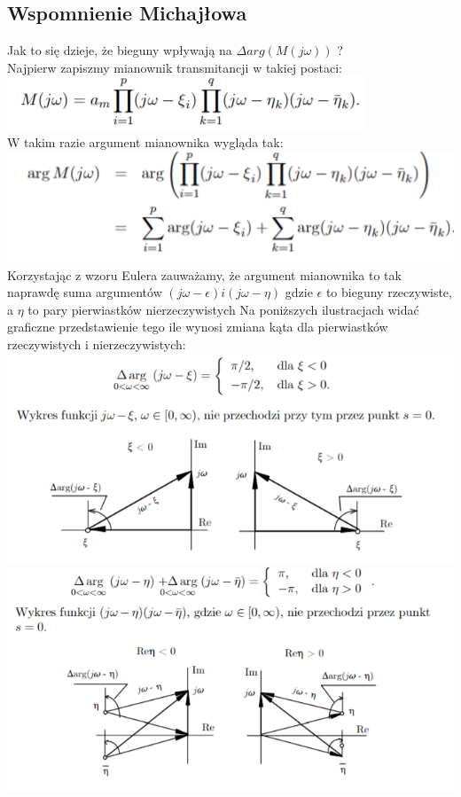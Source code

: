 \documentclass{article}
\begin{document}
\subsection{Wspomnienie Michajłowa}
\begin{center}
Jak to się dzieje, że bieguny wpływają na $\Delta arg(M(j\omega))$ ?\\Najpierw zapiszmy mianownik transmitancji w takiej postaci:
\includegraphics[]{mich1.png}\\
W takim razie argument mianownika wygląda tak:
\includegraphics[]{mich2.png}
Korzystając z wzoru Eulera zauważamy, że argument mianownika to tak naprawdę suma argumentów $(j\omega -\epsilon) i (j\omega -\eta)$ gdzie $\epsilon$ to bieguny rzeczywiste, a $\eta$ to pary pierwiastków nierzeczywistych\newpage
Na poniższych ilustracjach widać graficzne przedstawienie tego ile wynosi zmiana kąta dla pierwiastków rzeczywistych i nierzeczywistych:
\includegraphics[]{mich3.png}
\includegraphics[]{mich4.png}
\end{center}
\end{document}
